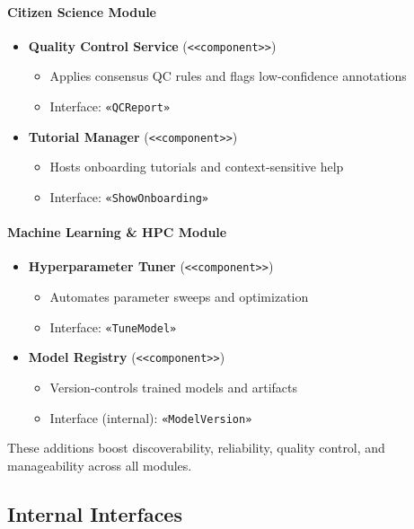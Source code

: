 \paragraph{Citizen Science Module}
\begin{itemize}
  \item \textbf{Quality Control Service} (\verb|<<component>>|)  
    \begin{itemize}
      \item Applies consensus QC rules and flags low‐confidence annotations  
      \item Interface: \verb|«QCReport»|
    \end{itemize}
  \item \textbf{Tutorial Manager} (\verb|<<component>>|)  
    \begin{itemize}
      \item Hosts onboarding tutorials and context‐sensitive help  
      \item Interface: \verb|«ShowOnboarding»|
    \end{itemize}
\end{itemize}

\paragraph{Machine Learning \& HPC Module}
\begin{itemize}
  \item \textbf{Hyperparameter Tuner} (\verb|<<component>>|)  
    \begin{itemize}
      \item Automates parameter sweeps and optimization  
      \item Interface: \verb|«TuneModel»|
    \end{itemize}
  \item \textbf{Model Registry} (\verb|<<component>>|)  
    \begin{itemize}
      \item Version‐controls trained models and artifacts  
      \item Interface (internal): \verb|«ModelVersion»|
    \end{itemize}
\end{itemize}

These additions boost discoverability, reliability, quality control, and manageability across all modules.

\subsection{Internal Interfaces}

